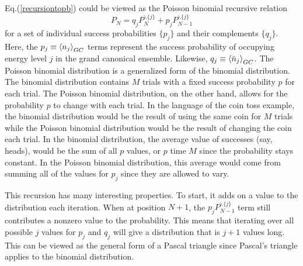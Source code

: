 Eq.\@ (\ref{recursiontopb}) could be viewed as the Poisson binomial recursive relation
\begin{equation}
    P_N=q_j  P_N^{\backslash\{j\}}+ p_j P_{N-1}^{\backslash\{j\}} \label{pbrr}
\end{equation}
for a set of individual success probabilities $\{p_j\}$ and their complements $\{q_j\}$. Here, the $p_j\equiv \left<{n_j}\right>_{GC}$ terms represent the success probability of occupying energy level $j$ in the grand canonical ensemble. Likewise, $q_j\equiv \left<{\bar{n}_j}\right>_{GC}$. The Poisson binomial distribution is a generalized form of the binomial distribution. The binomial distribution contains $M$ trials with a fixed success probability $p$ for each trial. The Poisson binomial distribution, on the other hand, allows for the probability $p$ to change with each trial. In the language of the coin toss example, the binomial distribution would be the result of using the same coin for $M$ trials while the Poisson binomial distribution would be the result of changing the coin each trial. In the binomial distribution, the average value of successes (say, heads), would be the sum of all $p$ values, or $p$ time $M$ since the probability stays constant. In the Poisson binomial distribution, this average would come from summing all of the values for $p_j$ since they are allowed to vary. 

This recursion has many interesting properties. To start, it adds on a value to the distribution each iteration. When at position $N+1$, the $p_j P_{N-1}^{\backslash\{j\}}$ term still contributes a nonzero value to the probability. This means that iterating over all possible $j$ values for $p_j$ and $q_j$ will give a distribution that is $j+1$ values long. This can be viewed as the general form of a Pascal triangle since Pascal's triangle applies to the binomial distribution. 

